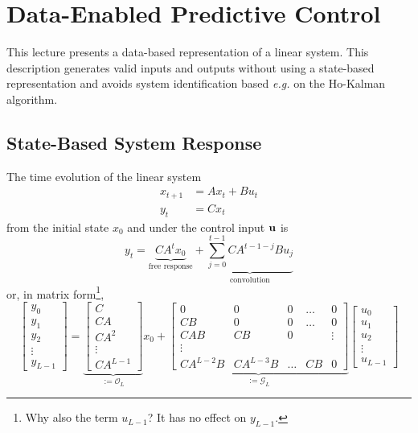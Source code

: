 \chapter{Data-Enabled Predictive Control}
\label{chap:deepc}

This lecture presents a data-based representation of a linear system. This description generates valid inputs and outputs without using a state-based representation and avoids system identification based \textit{e.g.} on the Ho-Kalman algorithm.

\section{State-Based System Response}
\label{sec:deepc-state-based-response}

The time evolution of the linear system
\begin{equation*}
  \begin{aligned}
    x_{t+1} &= Ax_t + Bu_t \\
    y_t &= Cx_t
  \end{aligned}
\end{equation*}
from the initial state $x_0$ and under the control input $\boldsymbol{\mathrm{u}}$ is
\begin{equation}
  \label{eq:time-evolution-free-response-convolution}
  y_t = \underbrace{CA^tx_0}_{\text{free response}} + \underbrace{\sum_{j=0}^{t-1}CA^{t-1-j}Bu_j}_{\text{convolution}}
\end{equation}
or, in matrix form\footnote{Why also the term $u_{L-1}$? It has no effect on $y_{L-1}$.},
\begin{equation}
  \label{eq:time-evolution-free-response-convolution-matrix}
  \begin{bmatrix}
    y_0 \\ y_1 \\ y_2 \\ \vdots \\ y_{L-1}
  \end{bmatrix} = \underbrace{
    \begin{bmatrix}
      C \\ CA \\ CA^2 \\ \vdots \\ CA^{L-1}
    \end{bmatrix}
  }_{:=\mathcal{O}_L} x_0 + \underbrace{
  \begin{bmatrix}
    0 & 0 & 0 & \ldots & 0 \\
    CB & 0 & 0 & \ldots & 0 \\
    CAB & CB & 0 & & \vdots \\
    \vdots \\
    CA^{L-2}B & CA^{L-3}B & \ldots & CB & 0
  \end{bmatrix}}_{:=\mathcal{G}_L}
\begin{bmatrix}
  u_0 \\ u_1 \\ u_2 \\ \vdots \\ u_{L-1}
  \end{bmatrix}
\end{equation}
